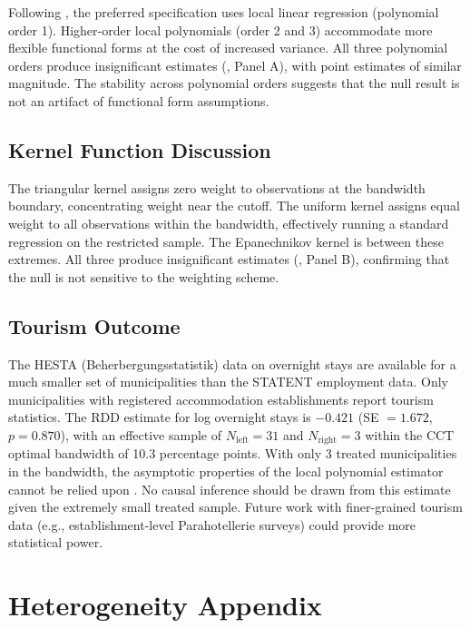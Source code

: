 \documentclass[12pt]{article}
\begin{document}
Following \citet{gelman2019}, the preferred specification uses local linear regression (polynomial order 1). Higher-order local polynomials (order 2 and 3) accommodate more flexible functional forms at the cost of increased variance. All three polynomial orders produce insignificant estimates (, Panel A), with point estimates of similar magnitude. The stability across polynomial orders suggests that the null result is not an artifact of functional form assumptions.

\subsection{Kernel Function Discussion}

The triangular kernel assigns zero weight to observations at the bandwidth boundary, concentrating weight near the cutoff. The uniform kernel assigns equal weight to all observations within the bandwidth, effectively running a standard regression on the restricted sample. The Epanechnikov kernel is between these extremes. All three produce insignificant estimates (, Panel B), confirming that the null is not sensitive to the weighting scheme.

\subsection{Tourism Outcome}\label{app:tourism}

The HESTA (Beherbergungsstatistik) data on overnight stays are available for a much smaller set of municipalities than the STATENT employment data. Only municipalities with registered accommodation establishments report tourism statistics. The RDD estimate for log overnight stays is $-0.421$ (SE $= 1.672$, $p = 0.870$), with an effective sample of $N_{\text{left}} = 31$ and $N_{\text{right}} = 3$ within the CCT optimal bandwidth of 10.3 percentage points. With only 3 treated municipalities in the bandwidth, the asymptotic properties of the local polynomial estimator cannot be relied upon \citep{calonico2014}. No causal inference should be drawn from this estimate given the extremely small treated sample. Future work with finer-grained tourism data (e.g., establishment-level Parahotellerie surveys) could provide more statistical power.

\section{Heterogeneity Appendix}\label{app:heterogeneity}
\end{document}
